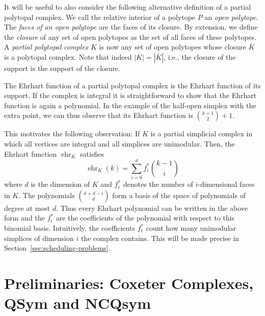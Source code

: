 \documentclass[12pt,reqno]{amsart}
\numberwithin{definition}{section}
\theoremstyle{definition}
\newcommand{\ehr}{\operatorname{ehr}}
\begin{document}
It will be useful to also consider the following alternative definition of a partial polytopal complex. We call the relative interior of a polytope $P$ an \emph{open polytope}. The \emph{faces of an open polytope} are the faces of its closure. By extension, we define the \emph{closure} of any set of open polytopes as the set of all faces of these polytopes. A \emph{partial polytopal complex} $K$ is now any set of open polytopes whose closure $\bar{K}$ is a polytopal complex. Note that indeed $\overline{|K|}=|\bar{K}|$, i.e., the closure of the support is the support of the closure.

The Ehrhart function of a partial polytopal complex is the Ehrhart function of its support. If the complex is integral it is straightforward to show that the Ehrhart function is again a polynomial. In the example of the half-open simplex with the extra point, we can thus observe that its Ehrhart function is $\binom{k+1}{2} + 1$.

This motivates the following observation: If $K$ is a partial simplicial complex in which all vertices are integral and all simplices are unimodular. Then, the Ehrhart function $\ehr_K$ satisfies
\[
  \ehr_K(k) = \sum_{i=0}^d f_i^* \binom{k-1}{i}
\]
where $d$ is the dimension of $K$ and $f_i^*$ denotes the number of $i$-dimensional faces in $K$.  The polynomials $\binom{k+d-i}{d}$ form a basis of the space of polynomials of degree at most $d$. Thus every Ehrhart polynomial can be written in the above form and the $f_i^*$ are the coefficients of the polynomial with respect to this binomial basis. Intuitively, the coefficients $f_i^*$ count how many unimodular simplices of dimension $i$ the complex contains. This will be made precise in Section~\ref{sec:scheduling-problems}.

\section{Preliminaries: Coxeter Complexes, QSym and NCQsym}
\label{ncqsym}
\end{document}
